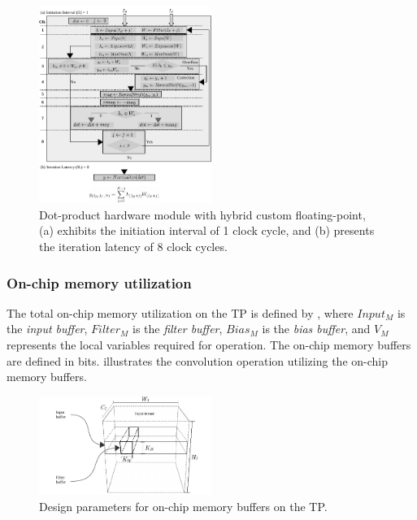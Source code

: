\begin{figure}[t!]
	\centering
	\includegraphics[width=0.5\textwidth]{../figures/dot_product_hybrid.pdf}
	\caption{Dot-product hardware module with hybrid custom floating-point, (a) exhibits the initiation interval of 1 clock cycle, and (b) presents
		the iteration latency of 8 clock cycles.}
	\label{fig:dot_product_hybrid}
\end{figure}


\subsubsection{\textbf{On-chip memory utilization}}
The total on-chip memory utilization on the TP is defined by , where $Input_{M}$ is the \emph{input buffer}, $Filter_{M}$ is the \emph{filter buffer}, $Bias_{M}$ is the \emph{bias buffer}, and $V_{M}$ represents the local variables required for operation. The on-chip memory buffers are defined in bits.  illustrates the convolution operation utilizing the on-chip memory buffers.

\begin{figure}[h!]
	\centering
	\includegraphics[width=0.5\textwidth]{../figures/accelerator_buffers.pdf}
	\caption{Design parameters for on-chip memory buffers on the TP.}
	\label{fig:accelerator_buffers}
\end{figure}

